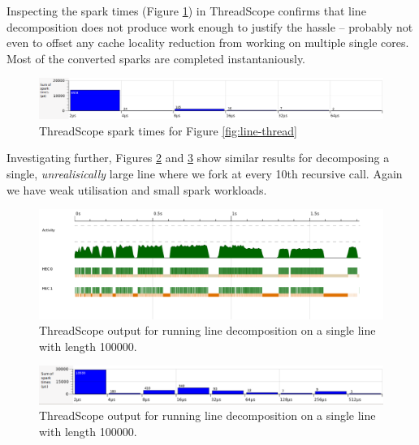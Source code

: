 \documentclass[12pt, a4paper]{article}
\begin{document}
Inspecting the spark times (Figure \ref{fig:line-thread-sparks}) in ThreadScope confirms that line
decomposition does not produce work enough to justify the hassle --
probably not even to offset any cache locality reduction from working 
on multiple single cores. Most of the converted sparks are completed instantaniously.

\begin{figure}[h!]
  \centering
  \includegraphics[width=0.85\linewidth]{../threadscope/lines/single-split-spark-times}
  \caption{ThreadScope spark times for Figure \ref{fig:line-thread}}
  \label{fig:line-thread-sparks}
\end{figure}

Investigating further, Figures \ref{fig:single-line-thread} and \ref{fig:single-line-thread-sparks}
show similar results for decomposing a single, \textit{unrealisically} large line where
 we fork at every 10th recursive call. Again we have
 weak utilisation and small spark workloads.

\begin{figure}[h!]
  \centering
  \includegraphics[width=0.85\linewidth]{../threadscope/lines/single-line-every-10}
  \caption{ThreadScope output for running line decomposition on a single line with length
    100000.}
  \label{fig:single-line-thread}
\end{figure}

\begin{figure}[h!]
  \centering
  \includegraphics[width=0.85\linewidth]{../threadscope/lines/single-line-every-10-spark-times}
  \caption{ThreadScope output for running line decomposition on a single line with length
    100000.}
  \label{fig:single-line-thread-sparks}
\end{figure}
\end{document}
